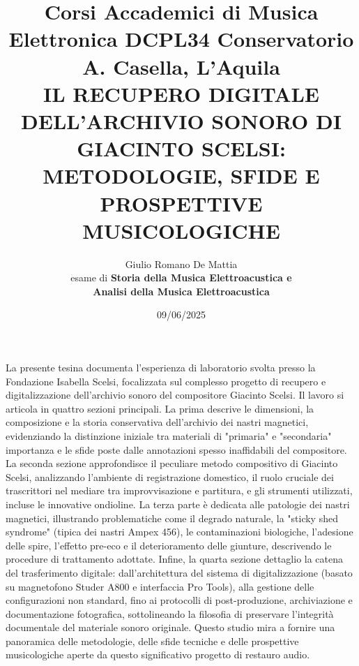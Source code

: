 \documentclass[a4paper,12pt]{article}
\title{Corsi Accademici di Musica Elettronica DCPL34 Conservatorio A. Casella, L'Aquila \\ \fontsize{14}{17}\bfseries\uppercase{Il Recupero Digitale dell'Archivio Sonoro di Giacinto Scelsi: Metodologie, Sfide e Prospettive Musicologiche}}
\author{Giulio Romano De Mattia \\ esame di \bfseries{Storia della Musica Elettroacustica} e \\ \bfseries{Analisi della Musica Elettroacustica}}
\date{09/06/2025}
\begin{document}
\maketitle
\thispagestyle{empty}

\begin{center}
    \vspace{1cm}
    \textbf{\fontsize{12}{15}\selectfont{Sommario}}
\end{center}

La presente tesina documenta l'esperienza di laboratorio svolta presso la Fondazione Isabella Scelsi, focalizzata sul complesso progetto di recupero e digitalizzazione dell'archivio sonoro del compositore Giacinto Scelsi. Il lavoro si articola in quattro sezioni principali. La prima descrive le dimensioni, la composizione e la storia conservativa dell'archivio dei nastri magnetici, evidenziando la distinzione iniziale tra materiali di "primaria" e "secondaria" importanza e le sfide poste dalle annotazioni spesso inaffidabili del compositore. La seconda sezione approfondisce il peculiare metodo compositivo di Giacinto Scelsi, analizzando l'ambiente di registrazione domestico, il ruolo cruciale dei trascrittori nel mediare tra improvvisazione e partitura, e gli strumenti utilizzati, incluse le innovative ondioline. La terza parte è dedicata alle patologie dei nastri magnetici, illustrando problematiche come il degrado naturale, la "sticky shed syndrome" (tipica dei nastri Ampex 456), le contaminazioni biologiche, l'adesione delle spire, l'effetto pre-eco e il deterioramento delle giunture, descrivendo le procedure di trattamento adottate. Infine, la quarta sezione dettaglio la catena del trasferimento digitale: dall'architettura del sistema di digitalizzazione (basato su magnetofono Studer A800 e interfaccia Pro Tools), alla gestione delle configurazioni non standard, fino ai protocolli di post-produzione, archiviazione e documentazione fotografica, sottolineando la filosofia di preservare l'integrità documentale del materiale sonoro originale. Questo studio mira a fornire una panoramica delle metodologie, delle sfide tecniche e delle prospettive musicologiche aperte da questo significativo progetto di restauro audio.
\newpage
\tableofcontents  

\newpage



\newpage %


\end{document}
